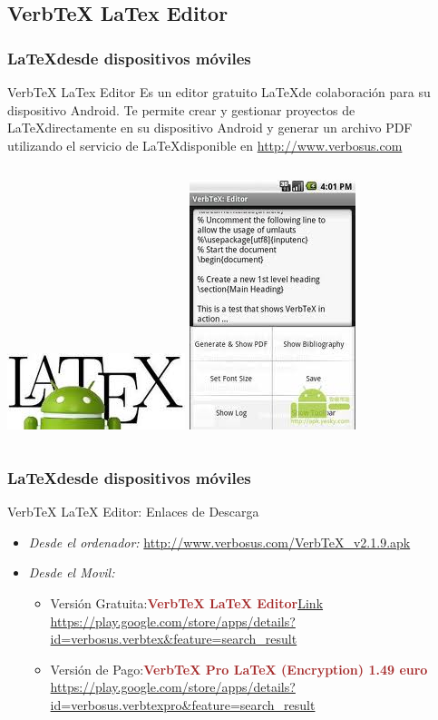 \documentclass[sans serif,9pt,xcolor=dvipsnames]{beamer}%
\begin{document}
\subsection{VerbTeX LaTex Editor}
\begin{frame}
\frametitle{\LaTeX desde dispositivos móviles}
\begin{block}{VerbTeX LaTex Editor}
\justifying
Es un editor gratuito \LaTeX de colaboración para su dispositivo Android. Te permite crear y gestionar proyectos de \LaTeX directamente en su dispositivo Android y generar un archivo PDF utilizando el servicio de \LaTeX disponible en \textcolor{blue}{\url{http://www.verbosus.com}}  
\end{block}
\begin{center}
\begin{columns}
 \hspace{0.7cm}
\includegraphics[width=2.5 cm]{imagenes/verbtex.jpg} 
\includegraphics[width=2.5 cm]{imagenes/movilVerbtex.jpg} 
\end{columns}
\end{center}




\end{frame}

\begin{frame}
\frametitle{\LaTeX desde dispositivos móviles}


\begin{block}{ VerbTeX LaTeX Editor: Enlaces de Descarga}
\begin{itemize}
\justifying
\item \textit{Desde el ordenador:}  \textcolor{blue}{\url{http://www.verbosus.com/VerbTeX_v2.1.9.apk}}
\item \textit{Desde el Movil:} 
\begin{itemize}
\justifying
\item Versión Gratuita:\textcolor{brown}{\textbf{VerbTeX LaTeX Editor}}\hfill \textcolor{blue}{\url{Link https://play.google.com/store/apps/details?id=verbosus.verbtex&feature=search_result }}
\item Versión de Pago:\textcolor{brown}{\textbf{VerbTeX Pro LaTeX (Encryption) 1.49 euro }}  \hfill \textcolor{blue}{\url{https://play.google.com/store/apps/details?id=verbosus.verbtexpro&feature=search_result }}
\end{itemize}
\end{itemize}
\end{block}

\end{frame}
\end{document}
